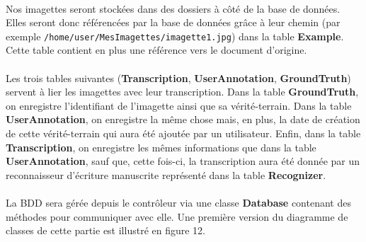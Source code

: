 \paragraph{}
Nos imagettes seront stockées dans des dossiers à côté de la base de données.
Elles seront donc référencées par la base de données grâce à leur chemin (par
exemple \texttt{/home/user/MesImagettes/imagette1.jpg}) dans la table
\textbf{Example}. Cette table contient en plus une référence vers le document
d’origine.

\paragraph{}

Les trois tables suivantes (\textbf{Transcription}, \textbf{UserAnnotation},
\textbf{GroundTruth}) servent à lier les imagettes avec leur transcription.
Dans la table \textbf{GroundTruth}, on enregistre l’identifiant de l’imagette
ainsi que sa vérité-terrain. Dans la table \textbf{UserAnnotation}, on
enregistre la même chose mais, en plus, la date de création de cette
vérité-terrain qui aura été ajoutée par un utilisateur. Enfin, dans la
table \textbf{Transcription}, on enregistre les mêmes informations que dans
la table \textbf{UserAnnotation}, sauf que, cette fois-ci, la transcription
aura été donnée par un reconnaisseur d’écriture manuscrite représenté dans
la table \textbf{Recognizer}.

\paragraph{}

La BDD sera gérée depuis le contrôleur via une classe \textbf{Database}
contenant des méthodes pour communiquer avec elle. Une première version du
diagramme de classes de cette partie est illustré en figure 12.

\paragraph{}

